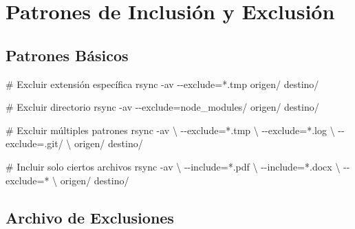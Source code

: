 \documentclass[
  doc,
  floatsintext,
  longtable,
  a4paper,
  nolmodern,
  notxfonts,
  notimes,
  12pt,
  colorlinks=true,linkcolor=blue,citecolor=blue,urlcolor=blue]{apa7}
\newenvironment{Shaded}{\begin{snugshade}}{\end{snugshade}}
\newcommand{\AttributeTok}[1]{\textcolor[rgb]{0.40,0.45,0.13}{#1}}
\newcommand{\CommentTok}[1]{\textcolor[rgb]{0.37,0.37,0.37}{#1}}
\newcommand{\DataTypeTok}[1]{\textcolor[rgb]{0.68,0.00,0.00}{#1}}
\newcommand{\FunctionTok}[1]{\textcolor[rgb]{0.28,0.35,0.67}{#1}}
\newcommand{\NormalTok}[1]{\textcolor[rgb]{0.00,0.23,0.31}{#1}}
\newcommand{\OperatorTok}[1]{\textcolor[rgb]{0.37,0.37,0.37}{#1}}
\newcommand{\StringTok}[1]{\textcolor[rgb]{0.13,0.47,0.30}{#1}}
\begin{document}
\section{Patrones de Inclusión y
Exclusión}\label{patrones-de-inclusiuxf3n-y-exclusiuxf3n}

\subsection{Patrones Básicos}\label{patrones-buxe1sicos}

\begin{Shaded}
\begin{Highlighting}[]
\CommentTok{\# Excluir extensión específica}
\FunctionTok{rsync} \AttributeTok{{-}av} \AttributeTok{{-}{-}exclude}\OperatorTok{=}\StringTok{\textquotesingle{}*.tmp\textquotesingle{}}\NormalTok{ origen/ destino/}

\CommentTok{\# Excluir directorio}
\FunctionTok{rsync} \AttributeTok{{-}av} \AttributeTok{{-}{-}exclude}\OperatorTok{=}\StringTok{\textquotesingle{}node\_modules/\textquotesingle{}}\NormalTok{ origen/ destino/}

\CommentTok{\# Excluir múltiples patrones}
\FunctionTok{rsync} \AttributeTok{{-}av} \DataTypeTok{\textbackslash{}}
  \AttributeTok{{-}{-}exclude}\OperatorTok{=}\StringTok{\textquotesingle{}*.tmp\textquotesingle{}} \DataTypeTok{\textbackslash{}}
  \AttributeTok{{-}{-}exclude}\OperatorTok{=}\StringTok{\textquotesingle{}*.log\textquotesingle{}} \DataTypeTok{\textbackslash{}}
  \AttributeTok{{-}{-}exclude}\OperatorTok{=}\StringTok{\textquotesingle{}.git/\textquotesingle{}} \DataTypeTok{\textbackslash{}}
\NormalTok{  origen/ destino/}

\CommentTok{\# Incluir solo ciertos archivos}
\FunctionTok{rsync} \AttributeTok{{-}av} \DataTypeTok{\textbackslash{}}
  \AttributeTok{{-}{-}include}\OperatorTok{=}\StringTok{\textquotesingle{}*.pdf\textquotesingle{}} \DataTypeTok{\textbackslash{}}
  \AttributeTok{{-}{-}include}\OperatorTok{=}\StringTok{\textquotesingle{}*.docx\textquotesingle{}} \DataTypeTok{\textbackslash{}}
  \AttributeTok{{-}{-}exclude}\OperatorTok{=}\StringTok{\textquotesingle{}*\textquotesingle{}} \DataTypeTok{\textbackslash{}}
\NormalTok{  origen/ destino/}
\end{Highlighting}
\end{Shaded}

\subsection{Archivo de Exclusiones}\label{archivo-de-exclusiones}
\end{document}
